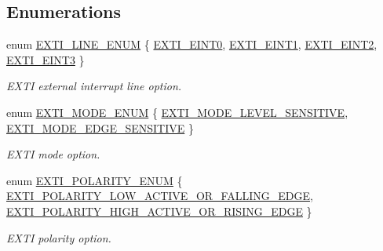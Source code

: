 \subsection*{\-Enumerations}
\begin{DoxyCompactItemize}
\item 
enum \hyperlink{group___e_x_t_i___public___types_ga801d7b6336865f9903b69623a89c1a69}{\-E\-X\-T\-I\-\_\-\-L\-I\-N\-E\-\_\-\-E\-N\-U\-M} \{ \hyperlink{group___e_x_t_i___public___types_gga801d7b6336865f9903b69623a89c1a69ad377ce1da312eee5419012f4ea4e8cfc}{\-E\-X\-T\-I\-\_\-\-E\-I\-N\-T0}, 
\hyperlink{group___e_x_t_i___public___types_gga801d7b6336865f9903b69623a89c1a69a9206c0e3387ea0842114e6b21ee6989a}{\-E\-X\-T\-I\-\_\-\-E\-I\-N\-T1}, 
\hyperlink{group___e_x_t_i___public___types_gga801d7b6336865f9903b69623a89c1a69a78bfa08ba291f38ae9c635a48e9af1db}{\-E\-X\-T\-I\-\_\-\-E\-I\-N\-T2}, 
\hyperlink{group___e_x_t_i___public___types_gga801d7b6336865f9903b69623a89c1a69aa5c4828278cdfa18339e309cbc0b92f0}{\-E\-X\-T\-I\-\_\-\-E\-I\-N\-T3}
 \}
\begin{DoxyCompactList}\small\item\em \-E\-X\-T\-I external interrupt line option. \end{DoxyCompactList}\item 
enum \hyperlink{group___e_x_t_i___public___types_ga97c789b0a35f1410c0a501ea23c54216}{\-E\-X\-T\-I\-\_\-\-M\-O\-D\-E\-\_\-\-E\-N\-U\-M} \{ \hyperlink{group___e_x_t_i___public___types_gga97c789b0a35f1410c0a501ea23c54216ab87355f21c5fa17dea721dd4c0986306}{\-E\-X\-T\-I\-\_\-\-M\-O\-D\-E\-\_\-\-L\-E\-V\-E\-L\-\_\-\-S\-E\-N\-S\-I\-T\-I\-V\-E}, 
\hyperlink{group___e_x_t_i___public___types_gga97c789b0a35f1410c0a501ea23c54216a82cf0daf7ed2f409eaec193681053f17}{\-E\-X\-T\-I\-\_\-\-M\-O\-D\-E\-\_\-\-E\-D\-G\-E\-\_\-\-S\-E\-N\-S\-I\-T\-I\-V\-E}
 \}
\begin{DoxyCompactList}\small\item\em \-E\-X\-T\-I mode option. \end{DoxyCompactList}\item 
enum \hyperlink{group___e_x_t_i___public___types_ga1b5e79307a79d0b2bc548041d4dd7dcd}{\-E\-X\-T\-I\-\_\-\-P\-O\-L\-A\-R\-I\-T\-Y\-\_\-\-E\-N\-U\-M} \{ \hyperlink{group___e_x_t_i___public___types_gga1b5e79307a79d0b2bc548041d4dd7dcda2a576545c4616da8e3493c752367cbc0}{\-E\-X\-T\-I\-\_\-\-P\-O\-L\-A\-R\-I\-T\-Y\-\_\-\-L\-O\-W\-\_\-\-A\-C\-T\-I\-V\-E\-\_\-\-O\-R\-\_\-\-F\-A\-L\-L\-I\-N\-G\-\_\-\-E\-D\-G\-E}, 
\hyperlink{group___e_x_t_i___public___types_gga1b5e79307a79d0b2bc548041d4dd7dcdaa76e2500404fdeb60f44cac0ec46cc2c}{\-E\-X\-T\-I\-\_\-\-P\-O\-L\-A\-R\-I\-T\-Y\-\_\-\-H\-I\-G\-H\-\_\-\-A\-C\-T\-I\-V\-E\-\_\-\-O\-R\-\_\-\-R\-I\-S\-I\-N\-G\-\_\-\-E\-D\-G\-E}
 \}
\begin{DoxyCompactList}\small\item\em \-E\-X\-T\-I polarity option. \end{DoxyCompactList}\end{DoxyCompactItemize}


